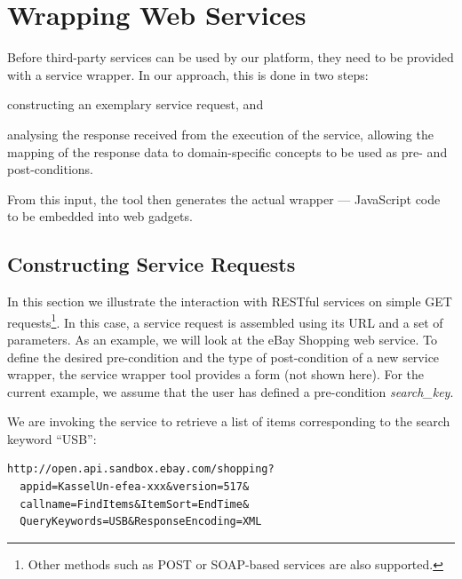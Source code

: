 
\section{Wrapping Web Services}
\label{sec:wrapping_web_services}

Before third-party services can be used by our platform, they need to be provided with a service wrapper. In our approach, this is done in two steps: 
\begin{inparaenum}[(i)]
	\item constructing an exemplary service request, and 
	\item analysing the response received from the execution of the service, allowing the mapping of the response data to domain-specific concepts to be used as pre- and post-conditions.
\end{inparaenum}
From this input, the tool then generates the actual wrapper --- JavaScript code to be embedded into web gadgets.

\subsection{Constructing Service Requests} %
\label{sub:constructing_service_requests}

In this section we illustrate the interaction with RESTful services on simple GET requests\footnote{Other methods such as POST or SOAP-based services are also supported.}. 
In this case, a service request is assembled using its URL and a set of parameters. As an example, we will look at the eBay Shopping web service. 
To define the desired pre-condition and the type of post-condition of a new service wrapper, the service wrapper tool provides a form (not shown here). For the current example, we assume that the user has defined a pre-condition \emph{search\_key}.

We are invoking the service to retrieve a list of items corresponding to the search keyword ``USB'':

\begin{lstlisting}
http://open.api.sandbox.ebay.com/shopping?
  appid=KasselUn-efea-xxx&version=517&
  callname=FindItems&ItemSort=EndTime&
  QueryKeywords=USB&ResponseEncoding=XML
\end{lstlisting}


